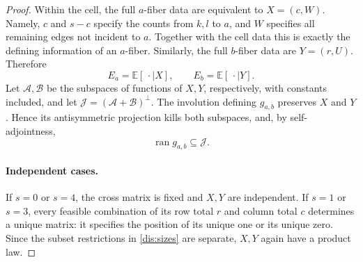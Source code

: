 \begin{proof}
Within the cell, the full $a$-fiber data are equivalent to
$X=(c,W)$. Namely, $c$ and $s-c$ specify the counts from $k,l$ to $a$,
and $W$ specifies all remaining edges not incident to $a$. Together
with the cell data this is exactly the defining information of an
$a$-fiber. Similarly, the full $b$-fiber data are $Y=(r,U)$. Therefore
\begin{equation}\label{dis:conditional}
 E_a=\mathbb E[\,\cdot\mid X],\qquad
 E_b=\mathbb E[\,\cdot\mid Y].
\end{equation}
Let $\mathcal A,\mathcal B$ be the subspaces of functions of $X,Y$,
respectively, with constants included, and let
$\mathcal J=(\mathcal A+\mathcal B)^\perp$.
The involution defining $g_{a,b}$ preserves $X$ and $Y$. Hence its
antisymmetric projection kills both subspaces, and, by
self-adjointness,
\begin{equation}\label{dis:g-range}
 \operatorname{ran}g_{a,b}\subseteq\mathcal J.
\end{equation}

\paragraph{Independent cases.}
If $s=0$ or $s=4$, the cross matrix is fixed and $X,Y$ are independent.
If $s=1$ or $s=3$, every feasible combination of its row total $r$ and
column total $c$ determines a unique matrix: it specifies the position
of its unique one or its unique zero. Since the subset restrictions
in \eqref{dis:sizes} are separate, $X,Y$ again have a product law.


\end{proof}
